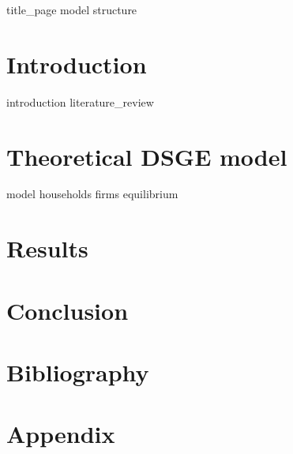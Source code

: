 \documentclass[12pt]{article}
\begin{document}
{title_page}
{model}
\pagebreak
{structure}
\pagebreak
\section{Introduction}
{introduction}
{literature_review}

\section{Theoretical DSGE model}
{model}
{households}
{firms}
{equilibrium}
\section{Results}
\section{Conclusion}
\section{Bibliography}
\section{Appendix}
\end{document}
